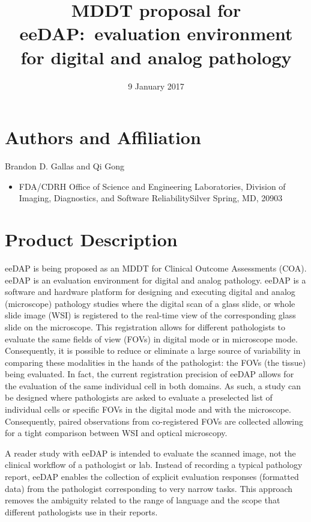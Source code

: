 \documentclass{article}%
\begin{document}
\title{MDDT proposal for eeDAP:\ evaluation environment for digital and analog pathology}
\date{9 January 2017}
\maketitle

\section{Authors and Affiliation}

Brandon D. Gallas and Qi Gong

\begin{itemize}
\item FDA/CDRH Office of Science and Engineering Laboratories, Division of
Imaging, Diagnostics, and Software Reliability\newline Silver Spring, MD, 20903
\end{itemize}

\section{Product Description}

\label{product-description}

eeDAP is being proposed as an MDDT for Clinical Outcome Assessments (COA).
eeDAP is an evaluation environment for digital and analog pathology. eeDAP is
a software and hardware platform for designing and executing digital and
analog (microscope) pathology studies where the digital scan of a glass slide,
or whole slide image (WSI) is registered to the real-time view of the
corresponding glass slide on the microscope. This registration allows for
different pathologists to evaluate the same fields of view (FOVs) in digital
mode or in microscope mode. Consequently, it is possible to reduce or
eliminate a large source of variability in comparing these modalities in the
hands of the pathologist: the FOVs (the tissue) being evaluated. In fact, the
current registration precision of eeDAP allows for the evaluation of the same
individual cell in both domains. As such, a study can be designed where
pathologists are asked to evaluate a preselected list of individual cells or
specific FOVs in the digital mode and with the microscope. Consequently,
paired observations from co-registered FOVs are collected allowing for a tight
comparison between WSI and optical microscopy.

A reader study with eeDAP is intended to evaluate the scanned image, not the
clinical workflow of a pathologist or lab. Instead of recording a typical
pathology report, eeDAP enables the collection of explicit evaluation
responses (formatted data) from the pathologist corresponding to very narrow
tasks. This approach removes the ambiguity related to the range of language
and the scope that different pathologists use in their reports.
\end{document}
